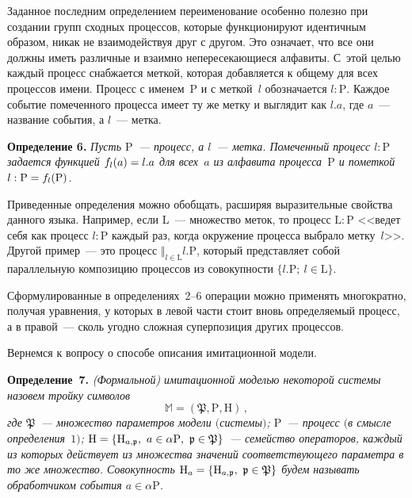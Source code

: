 \begin{multicols}{2}
    Заданное последним определением переименование особенно полезно 
при создании групп сходных процессов, которые функционируют 
идентичным образом, никак не взаимодействуя друг с \mbox{другом}. Это означает, 
что все они должны иметь различные и взаимно непересекающиеся 
алфавиты. С~этой целью каждый процесс снабжается меткой, которая 
добавляется к общему для всех процессов имени. Процесс с именем~P и с 
меткой~$l$ обозначается $l:\mathrm{P}$. Каждое событие помеченного 
процесса имеет ту же метку и выглядит как $l.a$, где $a$~--- название 
события, а $l$~--- метка.
    
    \medskip
    
    \noindent
    \textbf{Определение 6.} \textit{Пусть $\mathrm{P}$~--- процесс, а $l$~--- метка. 
Помеченный процесс $l:\mathrm{P}$ задается функцией $f_l(a)\hm=l.a$ для 
всех~$a$ из алфавита процесса~$\mathrm{P}$ и пометкой 
$l:\mathrm{P}\hm=f_l(\mathrm{P})$.}
    
    Приведенные определения можно обобщать, расширяя выразительные 
свойства данного языка. Например, если L~--- множество меток, то 
процесс $\mathrm{L}:\mathrm{P}$ <<ведет себя как процесс $l:\mathrm{P}$ каж\-дый раз, когда окружение 
процесса выбрало метку~$l$>>. Другой пример~--- это процесс $\Vert_{l\in 
\mathrm{L}}l.\mathrm{P}$, который пред\-став\-ля\-ет собой параллельную композицию 
процессов из совокупности $\{l.\mathrm{P};\ l\in \mathrm{L}\}$.
    
    Сформулированные в определениях~2--6 операции можно применять 
многократно, получая уравнения, у которых в левой части стоит вновь 
определяемый процесс, а в правой~--- сколь угодно сложная суперпозиция 
других процессов. 
    
    Вернемся к вопросу о способе описания имитационной модели.
    
    \medskip
    
    \noindent
    \textbf{Определение~7.} \textit{(Формальной) имитационной моделью 
некоторой системы назовем тройку символов
    $$
    \mathbb{M}=\left( \mathfrak{P},\mathrm{P},\mathrm{H}\right)\,,
    $$
где $\mathfrak{P}$~--- множество параметров модели $($системы$)$;
    $\mathrm{P}$~--- процесс $($в смысле определения~$1)$;
    $\mathrm{H}\hm=\left\{\mathrm{H}_{a,\mathfrak{p}},\ a\in \alpha 
\mathrm{P},\ \mathfrak{p}\in\mathfrak{P}\right\}$~--- семейство операторов, 
каждый из которых действует из множества значений соответствующего 
параметра в то же множество. Совокупность $\mathrm{H}_a\hm=\left\{ 
\mathrm{H}_{a,\mathfrak{p}},\ \mathfrak{p}\in \mathfrak{P}\right\}$ будем 
называть обработчиком события $a\in \alpha\mathrm{P}$.}
    

\end{multicols}
